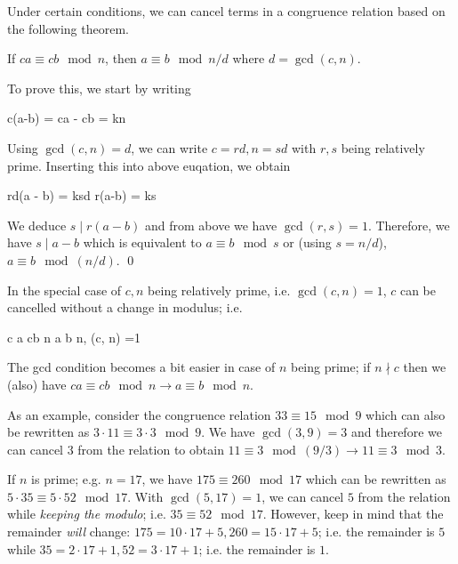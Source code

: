 Under certain conditions, we can cancel terms in a congruence relation based on the following theorem.

\begin{theorem}
    If $ca \equiv cb \mod n$, then $a \equiv b \mod n/d$ where $d = \gcd(c, n)$.
\end{theorem}

To prove this, we start by writing

\bee
c(a-b) = ca - cb = kn
\eee

Using $\gcd(c,n) = d$, we can write $c = rd, n = sd$ with $r, s$ being relatively prime. Inserting this into above euqation, we obtain

\bee
rd(a - b) = ksd \rightarrow r(a-b) = ks
\eee

We deduce $s \mid r(a-b)$ and from above we have $\gcd(r,s) = 1$. Therefore, we have $s \mid a-b$ which is equivalent to $a \equiv b \mod s$ or (using $s = n/d$), $a \equiv b \mod (n/d)$. \qed

In the special case of $c, n$ being relatively prime, i.e. $\gcd(c, n) = 1$, $c$ can be cancelled without a change in modulus; i.e.

\bee
c a \equiv cb \mod n \rightarrow a \equiv b \mod n, \quad {} \gcd(c, n) =1
\eee

The gcd condition becomes a bit easier in case of $n$ being prime; if $n \nmid c$ then we (also) have $c a \equiv cb \mod n \rightarrow a \equiv b \mod n$.

As an example, consider the congruence relation $33 \equiv 15 \mod 9$ which can also be rewritten as $3 \cdot 11 \equiv 3 \cdot 3 \mod 9$. We have $\gcd(3, 9) = 3$ and therefore we can cancel $3$ from the relation to obtain $11 \equiv 3 \mod (9/3) \rightarrow 11 \equiv 3 \mod 3$.

If $n$ is prime; e.g. $n = 17$, we have $175 \equiv 260 \mod 17$ which can be rewritten as $5 \cdot 35 \equiv 5 \cdot 52 \mod 17$. With $\gcd(5, 17) = 1$, we can cancel $5$ from the relation while \emph{keeping the modulo}; i.e. $35 \equiv 52 \mod 17$. However, keep in mind that the remainder \emph{will} change: $175 = 10 \cdot 17 + 5, 260 = 15 \cdot 17 + 5$; i.e. the remainder is $5$ while $35 = 2 \cdot 17 + 1, 52 = 3 \cdot 17 + 1$; i.e. the remainder is $1$.


